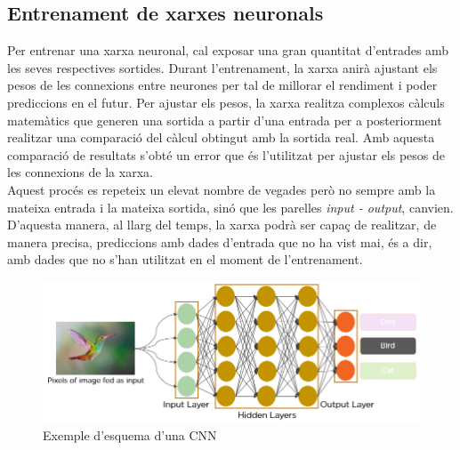 \documentclass[a4paper,12pt]{article}
\begin{document}
\subsection*{Entrenament de xarxes neuronals}
Per entrenar una xarxa neuronal, cal exposar una gran quantitat d'entrades amb les seves respectives sortides. Durant l'entrenament, la xarxa anirà ajustant els pesos de les connexions entre neurones per tal de millorar el rendiment i poder prediccions en el futur. Per ajustar els pesos, la xarxa realitza complexos càlculs matemàtics que generen una sortida a partir d'una entrada per a posteriorment realitzar una comparació del càlcul obtingut amb la sortida real. Amb aquesta comparació de resultats s'obté un error que és l'utilitzat per ajustar els pesos de les connexions de la xarxa.\\
Aquest procés es repeteix un elevat nombre de vegades però no sempre amb la mateixa entrada i la mateixa sortida, sinó que les parelles \textit{input - output}, canvien. D'aquesta manera, al llarg del temps, la xarxa podrà ser capaç de realitzar, de manera precisa, prediccions amb dades d'entrada que no ha vist mai, és a dir, amb dades que no s'han utilitzat en el moment de l'entrenament.
\begin{figure}[H]
    \centering
    \includegraphics[scale = 0.5]{images/CNN.png}
    \caption{Exemple d'esquema d'una CNN}
    \label{fig:cnn}
\end{figure}
\end{document}
